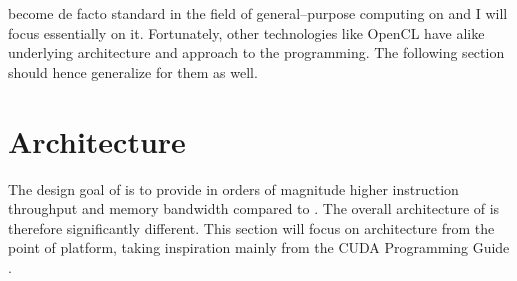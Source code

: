 \cuda become de facto standard in the field of general--purpose computing on \gpu and I will focus essentially on it. Fortunately, other technologies like OpenCL have alike underlying architecture and approach to the \gpu programming. The following section should hence generalize for them as well.




\section{Architecture}

The design goal of \gpu is to provide in orders of magnitude higher instruction throughput and memory bandwidth compared to \cpu. The overall architecture of \gpu is therefore significantly different. This section will focus on \gpu architecture from the point of \cuda platform, taking inspiration mainly from the CUDA Programming Guide \citep{CUDAguide}.

